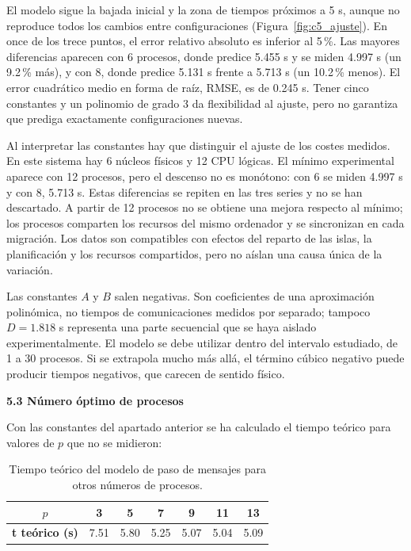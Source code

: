 \documentclass[12pt]{article}
\begin{document}
\begin{enumerate}
El modelo sigue la bajada inicial y la zona de tiempos próximos a 5 s, aunque no reproduce todos los cambios entre configuraciones (Figura~\ref{fig:c5_ajuste}). En once de los trece puntos, el error relativo absoluto es inferior al 5\,\%. Las mayores diferencias aparecen con 6 procesos, donde predice 5.455 s y se miden 4.997 s (un 9.2\,\% más), y con 8, donde predice 5.131 s frente a 5.713 s (un 10.2\,\% menos). El error cuadrático medio en forma de raíz, RMSE, es de 0.245 s. Tener cinco constantes y un polinomio de grado 3 da flexibilidad al ajuste, pero no garantiza que prediga exactamente configuraciones nuevas.

Al interpretar las constantes hay que distinguir el ajuste de los costes medidos. En este sistema hay 6 núcleos físicos y 12 CPU lógicas. El mínimo experimental aparece con 12 procesos, pero el descenso no es monótono: con 6 se miden 4.997 s y con 8, 5.713 s. Estas diferencias se repiten en las tres series y no se han descartado. A partir de 12 procesos no se obtiene una mejora respecto al mínimo; los procesos comparten los recursos del mismo ordenador y se sincronizan en cada migración. Los datos son compatibles con efectos del reparto de las islas, la planificación y los recursos compartidos, pero no aíslan una causa única de la variación.

Las constantes $A$ y $B$ salen negativas. Son coeficientes de una aproximación polinómica, no tiempos de comunicaciones medidos por separado; tampoco $D = 1.818$ s representa una parte secuencial que se haya aislado experimentalmente. El modelo se debe utilizar dentro del intervalo estudiado, de 1 a 30 procesos. Si se extrapola mucho más allá, el término cúbico negativo puede producir tiempos negativos, que carecen de sentido físico.

\medskip
\noindent\textbf{5.3 Número óptimo de procesos}\par
\smallskip

Con las constantes del apartado anterior se ha calculado el tiempo teórico para valores de $p$ que no se midieron:

\begin{table}[htbp]
\centering
\begin{tabular}{c|cccccc}
\toprule
\textbf{$p$} & 3 & 5 & 7 & 9 & 11 & 13 \\
\midrule
\textbf{t teórico (s)} & 7.51 & 5.80 & 5.25 & 5.07 & 5.04 & 5.09 \\
\bottomrule
\end{tabular}
\caption{Tiempo teórico del modelo de paso de mensajes para otros números de procesos.}
\label{tab:c5_teorico}
\end{table}


\end{enumerate}
\end{document}
